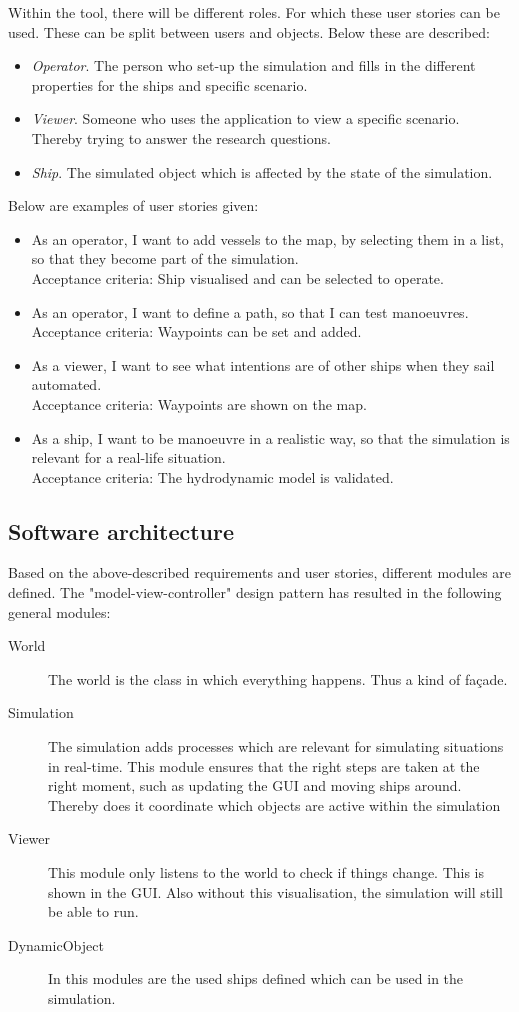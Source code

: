 Within the tool, there will be different roles. For which these user stories can be used. These can be split between users and objects. Below these are described:
\begin{itemize}
	\item \emph{Operator}. The person who set-up the simulation and fills in the different properties for the ships and specific scenario.
	\item \emph{Viewer}. Someone who uses the application to view a specific scenario. Thereby trying to answer the research questions.
	\item \emph{Ship}. The simulated object which is affected by the state of the simulation.
\end{itemize}

Below are examples of user stories given:
\begin{itemize}
	\item As an operator, I want to add vessels to the map, by selecting them in a list, so that they become part of the simulation. \\
	Acceptance criteria: Ship visualised and can be selected to operate.
	\item As an operator, I want to define a path, so that I can test manoeuvres. \\
	Acceptance criteria: Waypoints can be set and added.
	\item As a viewer, I want to see what intentions are of other ships when they sail automated. \\
	Acceptance criteria: Waypoints are shown on the map.
	\item As a ship, I want to be manoeuvre in a realistic way, so that the simulation is relevant for a real-life situation. \\
	Acceptance criteria: The hydrodynamic model is validated.
\end{itemize}

\subsection{Software architecture}
Based on the above-described requirements and user stories, different modules are defined. The "model-view-controller" design pattern has resulted in the following general modules:
\begin{description}
	\item[World] The world is the class in which everything happens. Thus a kind of façade.
	\item[Simulation] The simulation adds processes which are relevant for simulating situations in real-time. This module ensures that the right steps are taken at the right moment, such as updating the GUI and moving ships around. Thereby does it coordinate which objects are active within the simulation
	\item[Viewer] This module only listens to the world to check if things change. This is shown in the GUI. Also without this visualisation, the simulation will still be able to run.
	\item[DynamicObject] In this modules are the used ships defined which can be used in the simulation.
\end{description}

